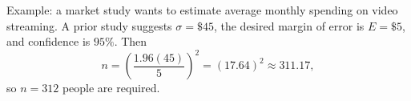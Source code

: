 \begin{solproblema}[prob:a691b8d]
Example: a market study wants to estimate average monthly spending on video streaming. A prior study suggests $\sigma=\$45$, the desired margin of error is $E=\$5$, and confidence is $95\%$. Then
\[
	n=\left(\frac{1.96(45)}{5}\right)^2=(17.64)^2\approx311.17,
\]
so $n=312$ people are required.
\end{solproblema}
